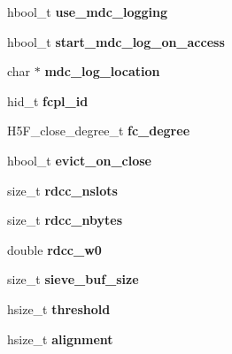 \begin{DoxyCompactItemize}
hbool\+\_\+t {\bfseries use\+\_\+mdc\+\_\+logging}
\item 
\mbox{\label{struct_h5_f__file__t_a0592a193025df92f877c91c1244f2248}} 
hbool\+\_\+t {\bfseries start\+\_\+mdc\+\_\+log\+\_\+on\+\_\+access}
\item 
\mbox{\label{struct_h5_f__file__t_ac6b2fb91cd2913bb35383f8c5cd966d0}} 
char $\ast$ {\bfseries mdc\+\_\+log\+\_\+location}
\item 
\mbox{\label{struct_h5_f__file__t_a03e4bd9f5e1415c8a45cc295aa13146f}} 
hid\+\_\+t {\bfseries fcpl\+\_\+id}
\item 
\mbox{\label{struct_h5_f__file__t_a60204110660636943acb48292e9d3d49}} 
H5\+F\+\_\+close\+\_\+degree\+\_\+t {\bfseries fc\+\_\+degree}
\item 
\mbox{\label{struct_h5_f__file__t_a6deb17b1d7d7c4524046c8fdfcadc017}} 
hbool\+\_\+t {\bfseries evict\+\_\+on\+\_\+close}
\item 
\mbox{\label{struct_h5_f__file__t_a12ec00e793fc3f273f818e60af5d260d}} 
size\+\_\+t {\bfseries rdcc\+\_\+nslots}
\item 
\mbox{\label{struct_h5_f__file__t_afdf4f5bfb944a657e3099d363a96514a}} 
size\+\_\+t {\bfseries rdcc\+\_\+nbytes}
\item 
\mbox{\label{struct_h5_f__file__t_a3337b216b12cceee0ed91d4617abffaf}} 
double {\bfseries rdcc\+\_\+w0}
\item 
\mbox{\label{struct_h5_f__file__t_a993611cbd4601c869e6043efe003dbfb}} 
size\+\_\+t {\bfseries sieve\+\_\+buf\+\_\+size}
\item 
\mbox{\label{struct_h5_f__file__t_aa032992c4856f174e9c66e5ea774e2bf}} 
hsize\+\_\+t {\bfseries threshold}
\item 
\mbox{\label{struct_h5_f__file__t_a64a54cca96676b6582650c93d3fb0d05}} 
hsize\+\_\+t {\bfseries alignment}
\item 

\end{DoxyCompactItemize}
